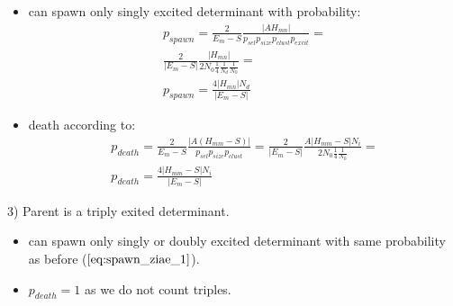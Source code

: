 \documentclass[twoside,english]{uiofysmaster}
\theoremstyle{definition}
\begin{document}
\begin{enumerate}
	\begin{itemize}
		\item can spawn only singly excited determinant with probability:
		\begin{align}\label{eq:spawn_ziae_1}
		p_{spawn} = \frac{2}{E_m - S} \frac{|AH_{mn}|}{ p_{sel}  p_{size} p_{clust} p_{excit} }=\\
		\frac{2}{|E_m  - S|} \frac{|H_{mn}|}{2N_0 \frac{1}{4} \frac{1}{N_d} \frac{1}{N_0}} =\\
		p_{spawn} =\frac{4|H_{mn}|N_d}{|E_m  - S|}
		\end{align}
		\item death according to:
		\begin{align}
		p_{death} = \frac{2}{E_m - S} \frac{|A(H_{mm}-S)|}{ p_{sel}  p_{size} p_{clust} }= \frac{2}{|E_m - S|} \frac{A|H_{mm}-S|N_i}{ 2N_0 \frac{1}{4} \frac{1}{N_0}}=\\
		p_{death} = \frac{4|H_{mm}-S|N_i}{|E_m - S|} 
		\end{align}
	\end{itemize}
	3) Parent is a triply exited determinant.
	\begin{itemize}
		\item can spawn only singly or doubly excited determinant with same probability as before ($\ref{eq:spawn_ziae_1}$).
		\item $p_{death} = 1$ as we do not count triples.
	\end{itemize}
	

\end{enumerate}
\end{document}
